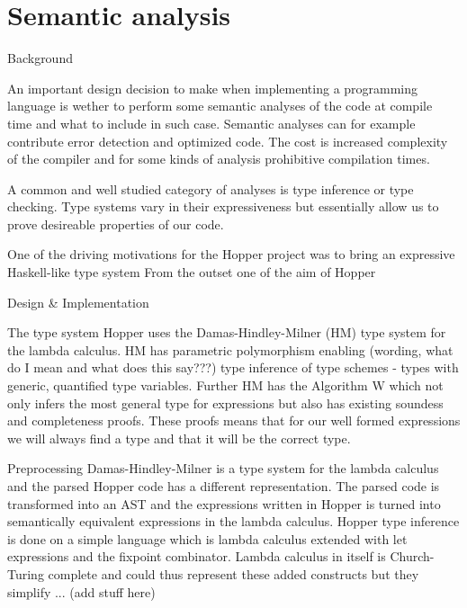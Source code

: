 \section{Semantic analysis}

Background

An important design decision to make when implementing a programming language is wether to perform some semantic analyses of the code at compile time and what to include in such case. Semantic analyses can for example contribute error detection and optimized code. The cost is increased complexity of the compiler and for some kinds of analysis prohibitive compilation times.

A common and well studied category of analyses is type inference or type checking. Type systems vary in their expressiveness but essentially allow us to prove desireable properties of our code.

One of the driving motivations for the Hopper project was to bring an expressive Haskell-like type system From the outset one of the  aim of Hopper















Design & Implementation

  The type system
    Hopper uses the Damas-Hindley-Milner (HM) type system for the lambda calculus. HM has parametric polymorphism enabling (wording, what do I mean and what does this say???) type inference of type schemes - types with generic, quantified type variables. Further HM has the Algorithm W which not only infers the most general type for expressions but also has existing soundess and completeness proofs. These proofs means that for our well formed expressions we will always find a type and that it will be the correct type.

  Preprocessing
    Damas-Hindley-Milner is a type system for the lambda calculus and the parsed Hopper code has a different representation. The parsed code is transformed into an AST and the expressions written in Hopper is turned into semantically equivalent expressions in the lambda calculus. Hopper type inference is done on a simple language which is lambda calculus extended with let expressions and the fixpoint combinator. Lambda calculus in itself is Church-Turing complete and could thus represent these added constructs but they simplify ... (add stuff here)
   
